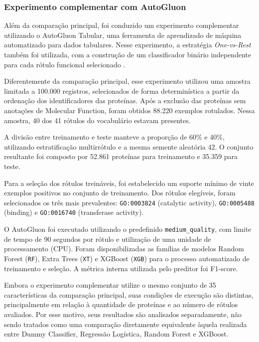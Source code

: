 \subsubsection{Experimento complementar com AutoGluon}

Além da comparação principal, foi conduzido um experimento complementar utilizando o AutoGluon Tabular, uma ferramenta de aprendizado de máquina automatizado para dados tabulares. Nesse experimento, a estratégia \textit{One-vs-Rest} também foi utilizada, com a construção de um classificador binário independente para cada rótulo funcional selecionado \cite{erickson2020}.

Diferentemente da comparação principal, esse experimento utilizou uma amostra limitada a 100.000 registros, selecionados de forma determinística a partir da ordenação dos identificadores das proteínas. Após a exclusão das proteínas sem anotações de Molecular Function, foram obtidos 88.220 exemplos rotulados. Nessa amostra, 40 dos 41 rótulos do vocabulário estavam presentes.

A divisão entre treinamento e teste manteve a proporção de 60\% e 40\%, utilizando estratificação multirrótulo e a mesma semente aleatória 42. O conjunto resultante foi composto por 52.861 proteínas para treinamento e 35.359 para teste.

Para a seleção dos rótulos treináveis, foi estabelecido um suporte mínimo de vinte exemplos positivos no conjunto de treinamento. Dos rótulos elegíveis, foram selecionados os três mais prevalentes: \texttt{GO:0003824} (catalytic activity), \texttt{GO:0005488} (binding) e \texttt{GO:0016740} (transferase activity).

O AutoGluon foi executado utilizando o predefinido \texttt{medium\_quality}, com limite de tempo de 90 segundos por rótulo e utilização de uma unidade de processamento (CPU). Foram disponibilizadas as famílias de modelos Random Forest (\texttt{RF}), Extra Trees (\texttt{XT}) e XGBoost (\texttt{XGB}) para o processo automatizado de treinamento e seleção. A métrica interna utilizada pelo preditor foi F1-score.

Embora o experimento complementar utilize o mesmo conjunto de 35 características da comparação principal, suas condições de execução são distintas, principalmente em relação à quantidade de proteínas e ao número de rótulos avaliados. Por esse motivo, seus resultados são analisados separadamente, não sendo tratados como uma comparação diretamente equivalente àquela realizada entre Dummy Classifier, Regressão Logística, Random Forest e XGBoost.



